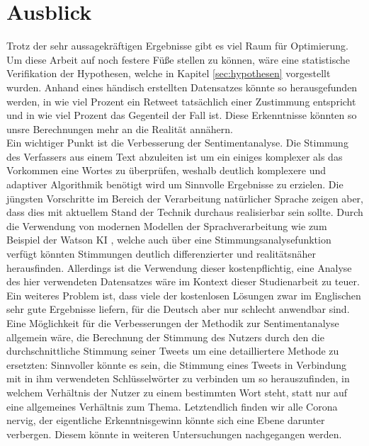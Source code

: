 \chapter{Ausblick}
\label{chap:ausblick}
Trotz der sehr aussagekräftigen Ergebnisse gibt es viel Raum für Optimierung. Um diese Arbeit auf noch festere Füße stellen zu können, wäre eine statistische Verifikation der Hypothesen, welche in Kapitel \ref{sec:hypothesen} vorgestellt wurden. Anhand eines händisch erstellten Datensatzes könnte so herausgefunden werden, in wie viel Prozent ein Retweet tatsächlich einer Zustimmung entspricht und in wie viel Prozent das Gegenteil der Fall ist. Diese Erkenntnisse könnten so unsre Berechnungen mehr an die Realität annähern. \\ \newline
Ein wichtiger Punkt ist die Verbesserung der Sentimentanalyse. Die Stimmung des Verfassers aus einem Text abzuleiten ist um ein einiges komplexer als das Vorkommen eine Wortes zu überprüfen, weshalb deutlich komplexere und adaptiver Algorithmik benötigt wird um Sinnvolle Ergebnisse zu erzielen. Die jüngsten Vorschritte im Bereich der Verarbeitung natürlicher Sprache zeigen aber, dass dies mit aktuellem Stand der Technik durchaus realisierbar sein sollte. Durch die Verwendung von modernen Modellen der Sprachverarbeitung wie zum Beispiel der Watson KI \cite{tone_ibm}, welche auch über eine Stimmungsanalysefunktion verfügt könnten Stimmungen deutlich differenzierter und realitätsnäher herausfinden. Allerdings ist die Verwendung dieser kostenpflichtig, eine Analyse des hier verwendeten Datensatzes wäre im Kontext dieser Studienarbeit zu teuer. Ein weiteres Problem ist, dass viele der kostenlosen Lösungen zwar im Englischen sehr gute Ergebnisse liefern, für die Deutsch aber nur schlecht anwendbar sind. Eine Möglichkeit für die Verbesserungen der Methodik zur Sentimentanalyse allgemein wäre, die Berechnung der Stimmung des Nutzers durch den die durchschnittliche Stimmung seiner Tweets um eine detailliertere Methode zu ersetzten: Sinnvoller könnte es sein, die Stimmung eines Tweets in Verbindung mit in ihm verwendeten Schlüsselwörter zu verbinden um so herauszufinden, in welchem Verhältnis der Nutzer zu einem bestimmten Wort steht, statt nur auf eine allgemeines Verhältnis zum Thema. Letztendlich finden wir alle Corona nervig, der eigentliche Erkenntnisgewinn könnte sich eine Ebene darunter verbergen. Diesem könnte in weiteren Untersuchungen nachgegangen werden. \\ \newline
